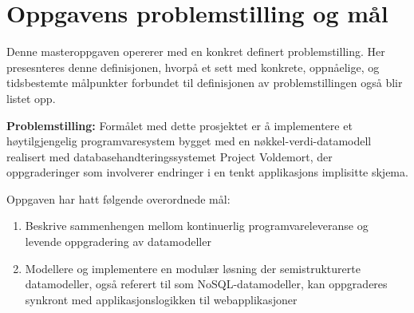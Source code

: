 \section{Oppgavens problemstilling og mål} \label{goals}

Denne masteroppgaven opererer med en konkret definert problemstilling. Her presesnteres denne definisjonen, hvorpå et sett med konkrete, oppnåelige, og tidsbestemte målpunkter forbundet til definisjonen av problemstillingen også blir listet opp.

\textbf{Problemstilling:} Formålet med dette prosjektet er å implementere et høytilgjengelig programvaresystem bygget med en nøkkel-verdi-datamodell realisert med databasehandteringssystemet Project Voldemort, der oppgraderinger som involverer endringer i en tenkt applikasjons implisitte skjema.

Oppgaven har hatt følgende overordnede mål:

\begin{enumerate}
  \item Beskrive sammenhengen mellom kontinuerlig programvareleveranse og \\ levende oppgradering av datamodeller %
  \item Modellere og implementere en modulær løsning der semistrukturerte datamodeller, også referert til som NoSQL-datamodeller, kan oppgraderes synkront med applikasjonslogikken til webapplikasjoner %
\end{enumerate}




